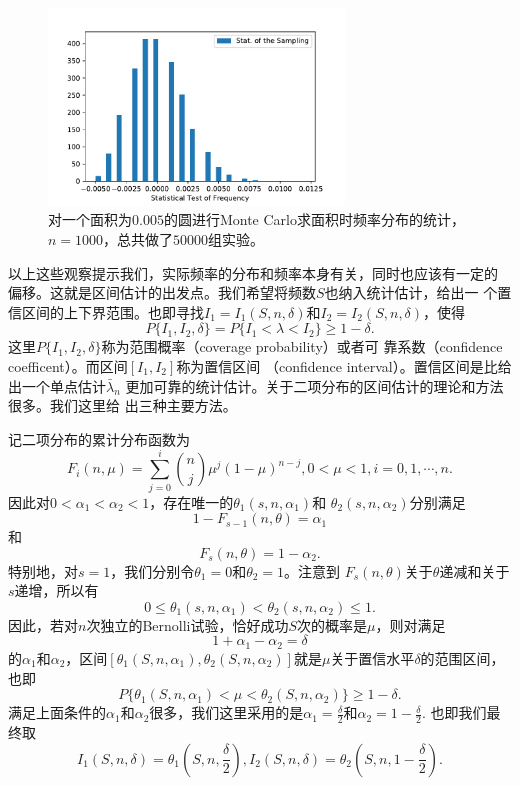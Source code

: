 \begin{figure}[!ht]
\centering
\includegraphics[width=0.7\textwidth]{images/bais_lambda_n.pdf}
\caption{对一个面积为$0.005$的圆进行Monte Carlo求面积时频率分布的统计，
  $n = 1000$，总共做了$50000$组实验。}
\label{fig::bias_lambda_n}
\end{figure}

以上这些观察提示我们，实际频率的分布和频率本身有关，同时也应该有一定的
偏移。这就是区间估计的出发点。我们希望将频数$S$也纳入统计估计，给出一
个置信区间的上下界范围。也即寻找$I_1 = I_1(S, n, \delta)$和$I_2 =
I_2(S, n, \delta)$，使得
$$
P\{I_1, I_2, \delta\} = P\{I_1 < \lambda < I_2\} \geq 1 -\delta.
$$
这里$P\{I_1, I_2, \delta\}$称为范围概率（coverage probability）或者可
靠系数（confidence coefficent）。而区间$[I_1, I_2]$称为置信区间
（confidence interval）。置信区间是比给出一个单点估计$\bar{\lambda}_n$
更加可靠的统计估计。关于二项分布的区间估计的理论和方法很多。我们这里给
出三种主要方法。

记二项分布的累计分布函数为
\begin{equation}
  F_i(n, \mu) = \sum_{j = 0}^i \binom{n}{j} \mu^j (1 - \mu)^{n - j}, 0
  < \mu < 1, i = 0, 1, \cdots, n.
  \label{eq::binomial_CDF}
\end{equation}
因此对$0 < \alpha_1 < \alpha_2 <1$，存在唯一的$\theta_1(s, n, \alpha_1)$和
$\theta_2(s, n, \alpha_2)$分别满足
\begin{equation}
  1 - F_{s - 1}(n, \theta) = \alpha_1
  \label{eq::binomial_theta_1}
\end{equation}
和
\begin{equation}
  F_s(n, \theta) = 1 - \alpha_2.
  \label{eq::binomial_theta_2}
\end{equation}
特别地，对$s = 1$，我们分别令$\theta_1 = 0$和$\theta_2 = 1$。注意到
$F_s(n, \theta)$关于$\theta$递减和关于$s$递增，所以有
$$
0 \leq \theta_1(s, n, \alpha_1) < \theta_2(s, n, \alpha_2) \leq 1.
$$
因此，若对$n$次独立的Bernolli试验，恰好成功$S$次的概率是$\mu$，则对满足
$$
1 + \alpha_1 - \alpha_2 = \delta
$$
的$\alpha_1$和$\alpha_2$，区间$[\theta_1(S, n, \alpha_1),
  \theta_2(S, n, \alpha_2)]$就是$\mu$关于置信水平$\delta$的范围区间，也即
$$
P\{\theta_1(S, n, \alpha_1) < \mu < \theta_2(S, n, \alpha_2)\} \geq 1 - \delta.
$$
满足上面条件的$\alpha_1$和$\alpha_2$很多，我们这里采用的是$\alpha_1
= \frac{\delta}{2}$和$\alpha_2 = 1 - \frac{\delta}{2}$. 也即我们最终取
$$
I_1(S, n, \delta) = \theta_1(S, n, \frac{\delta}{2}),
I_2(S, n, \delta) = \theta_2(S, n, 1 - \frac{\delta}{2}).
$$

